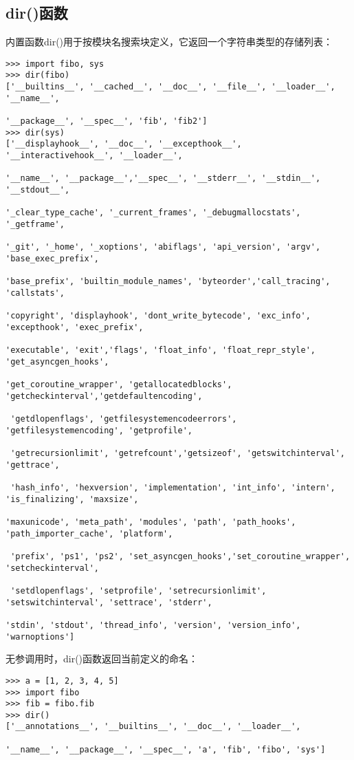 \documentclass[UTF8]{ctexart}
\begin{document}
\subsection{dir()函数}
内置函数dir()用于按模块名搜索块定义，它返回一个字符串类型的存储列表：
\begin{verbatim}
>>> import fibo, sys
>>> dir(fibo)
['__builtins__', '__cached__', '__doc__', '__file__', '__loader__', '__name__',

'__package__', '__spec__', 'fib', 'fib2']
>>> dir(sys)
['__displayhook__', '__doc__', '__excepthook__', '__interactivehook__', '__loader__',

'__name__', '__package__','__spec__', '__stderr__', '__stdin__', '__stdout__',

'_clear_type_cache', '_current_frames', '_debugmallocstats', '_getframe',

'_git', '_home', '_xoptions', 'abiflags', 'api_version', 'argv', 'base_exec_prefix',

'base_prefix', 'builtin_module_names', 'byteorder','call_tracing', 'callstats',

'copyright', 'displayhook', 'dont_write_bytecode', 'exc_info', 'excepthook', 'exec_prefix',

'executable', 'exit','flags', 'float_info', 'float_repr_style', 'get_asyncgen_hooks',

'get_coroutine_wrapper', 'getallocatedblocks', 'getcheckinterval','getdefaultencoding',

 'getdlopenflags', 'getfilesystemencodeerrors', 'getfilesystemencoding', 'getprofile',

 'getrecursionlimit', 'getrefcount','getsizeof', 'getswitchinterval', 'gettrace',

 'hash_info', 'hexversion', 'implementation', 'int_info', 'intern', 'is_finalizing', 'maxsize',

'maxunicode', 'meta_path', 'modules', 'path', 'path_hooks', 'path_importer_cache', 'platform',

 'prefix', 'ps1', 'ps2', 'set_asyncgen_hooks','set_coroutine_wrapper', 'setcheckinterval',

 'setdlopenflags', 'setprofile', 'setrecursionlimit', 'setswitchinterval', 'settrace', 'stderr',

'stdin', 'stdout', 'thread_info', 'version', 'version_info', 'warnoptions']
\end{verbatim}

无参调用时，dir()函数返回当前定义的命名：
\begin{verbatim}
>>> a = [1, 2, 3, 4, 5]
>>> import fibo
>>> fib = fibo.fib
>>> dir()
['__annotations__', '__builtins__', '__doc__', '__loader__',

'__name__', '__package__', '__spec__', 'a', 'fib', 'fibo', 'sys']
\end{verbatim}
\end{document}
